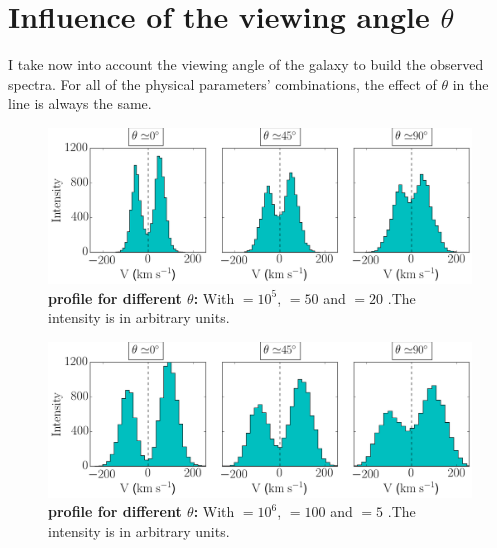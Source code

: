 \section{Influence of the viewing angle $\theta$}
I take now into account the viewing angle of the galaxy to build the observed spectra. For all of the physical parameters' combinations, the effect of $\theta$ in the \lya line is always the same.\\

\begin{figure}[h!]
	\begin{center}
		\includegraphics[width=1\textwidth]{./figures/chapter3/influence_viewing_angle_5}
	\end{center}
	\caption{\textbf{\lya profile for different $\theta$:} With \tauh$=10^5$, \vrot$=50$ \kms and \vout$=20$ \kms.The intensity is in arbitrary units.
		\label{fig:influence_viewing_angle_5}}
\end{figure}

\begin{figure}[h!]
	\begin{center}
		\includegraphics[width=1\textwidth]{./figures/chapter3/influence_viewing_angle_6}
	\end{center}
	\caption{\textbf{\lya profile for different $\theta$:} With \tauh$=10^6$, \vrot$=100$ \kms and \vout$=5$ \kms.The intensity is in arbitrary units.
		\label{fig:influence_viewing_angle_6}}
\end{figure}

